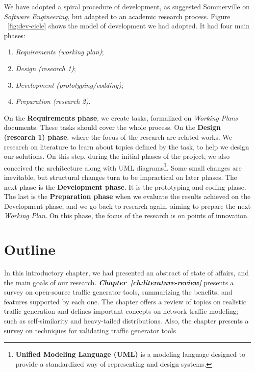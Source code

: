 We have adopted a spiral procedure of development, as suggested Sommerville on \textit{Software Engineering}\cite{sommerville}, but adapted to an academic research process. Figure ~\ref{fig:dev-cicle} shows the model of development we had adopted. It had four main phases: 

\begin{enumerate}
    \item \textit{Requirements (working plan)};
    \item \textit{Design (research 1)};
    \item \textit{Development (prototyping/codding)};
    \item \textit{Preparation (research 2)}.
\end{enumerate}

On the \textbf{Requirements phase}, we create tasks,  formalized on \textit{Working Plans} documents.  These tasks should cover the whole process. On the \textbf{Design (research 1) phase}, where the focus of the research are related works. We research on literature to learn about topics defined by the task, to help we design our solutions. On this step, during the initial phases of the project,  we also conceived the architecture along with \acrshort{UML} diagrams\footnote{\textbf{Unified Modeling Language (UML)} is a modeling language designed to provide a standardized way of representing and design systems\cite{uml}.}. Some small changes are inevitable, but structural changes turn to be impractical on later phases. The next phase is the \textbf{Development phase}. It is the prototyping and coding phase.  The last is the \textbf{Preparation phase} when we evaluate the results achieved on the Development phase, and we go back to research again,  aiming to prepare the next \textit{Working Plan}.  On this phase, the focus of the research is on points of innovation.


\section{Outline}


In this introductory chapter, we had presented an abstract of state of affairs, and the main goals of our research. \textit{\textbf{Chapter~\ref{ch:literature-review}}} presents a survey on open-source traffic generator tools, summarizing the benefits, and features supported by each one. The chapter offers a  review of topics on realistic traffic generation and defines important concepts on network traffic modeling; such as self-similarity and heavy-tailed distributions. Also, the chapter presents a survey on techniques for validating traffic generator tools 

